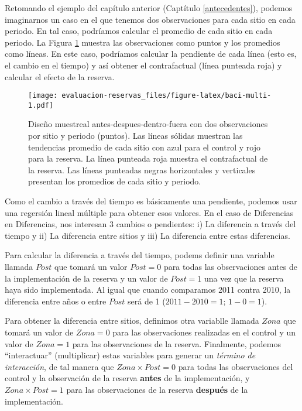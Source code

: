 \documentclass[]{krantz}
\begin{document}
Retomando el ejemplo del capítulo anterior (Captítulo
\ref{antecedentes}), podemos imaginarnos un caso en el que tenemos dos
observaciones para cada sitio en cada periodo. En tal caso, podríamos
calcular el promedio de cada sitio en cada periodo. La Figura
\ref{fig:baci-multi} muestra las observaciones como puntos y los
promedios como líneas. En este caso, podríamos calcular la pendiente de
cada línea (esto es, el cambio en el tiempo) y así obtener el
contrafactual (línea punteada roja) y calcular el efecto de la reserva.

\begin{figure}
\centering
\texttt{[image: evaluacion-reservas\_files/figure-latex/baci-multi-1.pdf]}
\caption{\label{fig:baci-multi}Diseño muestreal antes-despues-dentro-fuera
con dos observaciones por sitio y periodo (puntos). Las líneas sólidas
muestran las tendencias promedio de cada sitio con azul para el control
y rojo para la reserva. La línea punteada roja muestra el contrafactual
de la reserva. Las líneas punteadas negras horizontales y verticales
presentan los promedios de cada sitio y periodo.}
\end{figure}

Como el cambio a través del tiempo es básicamente una pendiente, podemos
usar una regersión lineal múltiple para obtener esos valores. En el caso
de Diferencias en Diferencias, nos interesan 3 cambios o pendientes: i)
La diferencia a través del tiempo y ii) La diferencia entre sitios y
iii) La diferencia entre estas diferencias.

Para calcular la diferencia a través del tiempo, podems definir una
variable llamada \(Post\) que tomará un valor \(Post = 0\) para todas
las observaciones antes de la implementación de la reserva y un valor de
\(Post = 1\) una vez que la reserva haya sido implementada. Al igual que
cuando comparamos 2011 contra 2010, la diferencia entre años o entre
\(Post\) será de 1 (\(2011 - 2010 = 1\); \(1 - 0 = 1\)).

Para obtener la diferencia entre sitios, definimos otra variablle
llamada \(Zona\) que tomará un valor de \(Zona = 0\) para las
observaciones realizadas en el control y un valor de \(Zona = 1\) para
las observaciones de la reserva. Finalmente, podemos ``interactuar''
(multiplicar) estas variables para generar un \emph{término de
interacción}, de tal manera que \(Zona \times Post = 0\) para todas las
observaciones del control y la observación de la reserva \textbf{antes}
de la implementación, y \(Zona \times Post = 1\) para las observaciones
de la reserva \textbf{después} de la implementación.
\end{document}
